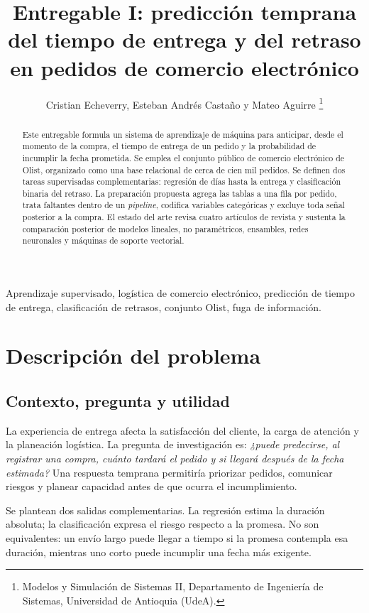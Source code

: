 \documentclass[journal]{IEEEtran}
\title{Entregable I: predicción temprana del tiempo de entrega y del retraso en pedidos de comercio electrónico}
\author{Cristian Echeverry, Esteban Andrés Castaño y Mateo Aguirre%
\thanks{Modelos y Simulación de Sistemas II, Departamento de Ingeniería de Sistemas, Universidad de Antioquia (UdeA).}}
\begin{document}
\maketitle

\begin{abstract}
Este entregable formula un sistema de aprendizaje de máquina para anticipar, desde el momento de la compra, el tiempo de entrega de un pedido y la probabilidad de incumplir la fecha prometida. Se emplea el conjunto público de comercio electrónico de Olist, organizado como una base relacional de cerca de cien mil pedidos. Se definen dos tareas supervisadas complementarias: regresión de días hasta la entrega y clasificación binaria del retraso. La preparación propuesta agrega las tablas a una fila por pedido, trata faltantes dentro de un \emph{pipeline}, codifica variables categóricas y excluye toda señal posterior a la compra. El estado del arte revisa cuatro artículos de revista y sustenta la comparación posterior de modelos lineales, no paramétricos, ensambles, redes neuronales y máquinas de soporte vectorial.
\end{abstract}

\begin{IEEEkeywords}
Aprendizaje supervisado, logística de comercio electrónico, predicción de tiempo de entrega, clasificación de retrasos, conjunto Olist, fuga de información.
\end{IEEEkeywords}

\section{Descripción del problema}
\subsection{Contexto, pregunta y utilidad}
La experiencia de entrega afecta la satisfacción del cliente, la carga de atención y la planeación logística. La pregunta de investigación es: \emph{¿puede predecirse, al registrar una compra, cuánto tardará el pedido y si llegará después de la fecha estimada?} Una respuesta temprana permitiría priorizar pedidos, comunicar riesgos y planear capacidad antes de que ocurra el incumplimiento.

Se plantean dos salidas complementarias. La regresión estima la duración absoluta; la clasificación expresa el riesgo respecto a la promesa. No son equivalentes: un envío largo puede llegar a tiempo si la promesa contempla esa duración, mientras uno corto puede incumplir una fecha más exigente.
\end{document}
